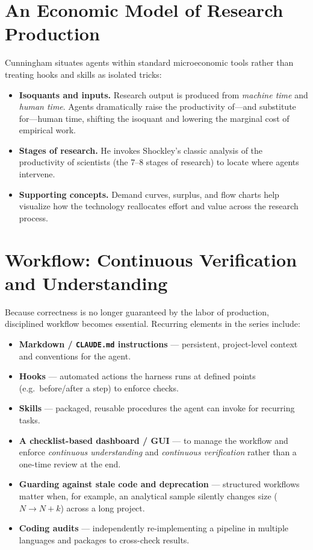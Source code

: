 \documentclass[11pt]{article}
\begin{document}
\section{An Economic Model of Research Production}
Cunningham situates agents within standard microeconomic tools rather than
treating hooks and skills as isolated tricks:
\begin{itemize}[leftmargin=1.5em]
  \item \textbf{Isoquants and inputs.} Research output is produced from \emph{machine time} and \emph{human time}. Agents dramatically raise the productivity of---and substitute for---human time, shifting the isoquant and lowering the marginal cost of empirical work.
  \item \textbf{Stages of research.} He invokes Shockley's classic analysis of the productivity of scientists (the 7--8 stages of research) to locate where agents intervene.
  \item \textbf{Supporting concepts.} Demand curves, surplus, and flow charts help visualize how the technology reallocates effort and value across the research process.
\end{itemize}

\section{Workflow: Continuous Verification and Understanding}
Because correctness is no longer guaranteed by the labor of production, disciplined
workflow becomes essential. Recurring elements in the series include:
\begin{itemize}[leftmargin=1.5em]
  \item \textbf{Markdown / \texttt{CLAUDE.md} instructions} --- persistent, project-level context and conventions for the agent.
  \item \textbf{Hooks} --- automated actions the harness runs at defined points (e.g.\ before/after a step) to enforce checks.
  \item \textbf{Skills} --- packaged, reusable procedures the agent can invoke for recurring tasks.
  \item \textbf{A checklist-based dashboard / GUI} --- to manage the workflow and enforce \emph{continuous understanding} and \emph{continuous verification} rather than a one-time review at the end.
  \item \textbf{Guarding against stale code and deprecation} --- structured workflows matter when, for example, an analytical sample silently changes size ($N \to N+k$) across a long project.
  \item \textbf{Coding audits} --- independently re-implementing a pipeline in multiple languages and packages to cross-check results.
\end{itemize}
\end{document}
